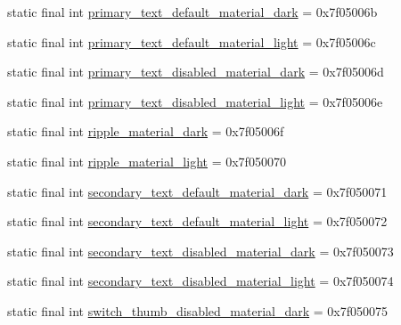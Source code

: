 \begin{DoxyCompactItemize}
\item 
static final int \mbox{\hyperlink{classandroid_1_1support_1_1v7_1_1appcompat_1_1R_1_1color_add4e227c0820079bd8c7277ed459e013}{primary\+\_\+text\+\_\+default\+\_\+material\+\_\+dark}} = 0x7f05006b
\item 
static final int \mbox{\hyperlink{classandroid_1_1support_1_1v7_1_1appcompat_1_1R_1_1color_ab36d1e90360d5a93724ea06e0fb4eaea}{primary\+\_\+text\+\_\+default\+\_\+material\+\_\+light}} = 0x7f05006c
\item 
static final int \mbox{\hyperlink{classandroid_1_1support_1_1v7_1_1appcompat_1_1R_1_1color_a71e048d87b5feafa695cf01a565a4e3e}{primary\+\_\+text\+\_\+disabled\+\_\+material\+\_\+dark}} = 0x7f05006d
\item 
static final int \mbox{\hyperlink{classandroid_1_1support_1_1v7_1_1appcompat_1_1R_1_1color_acbf6e5e5cb1d31d8e8532e7b1402ca96}{primary\+\_\+text\+\_\+disabled\+\_\+material\+\_\+light}} = 0x7f05006e
\item 
static final int \mbox{\hyperlink{classandroid_1_1support_1_1v7_1_1appcompat_1_1R_1_1color_a8a6b3082ea6856989bc2959dfe9276c5}{ripple\+\_\+material\+\_\+dark}} = 0x7f05006f
\item 
static final int \mbox{\hyperlink{classandroid_1_1support_1_1v7_1_1appcompat_1_1R_1_1color_a15949cbaffddc41a139e2075c8bb3f14}{ripple\+\_\+material\+\_\+light}} = 0x7f050070
\item 
static final int \mbox{\hyperlink{classandroid_1_1support_1_1v7_1_1appcompat_1_1R_1_1color_a37d7fa18b0ff48fbaf8ee035afc43a2c}{secondary\+\_\+text\+\_\+default\+\_\+material\+\_\+dark}} = 0x7f050071
\item 
static final int \mbox{\hyperlink{classandroid_1_1support_1_1v7_1_1appcompat_1_1R_1_1color_a2f57c3847bf68150f0fd7f8c93799ad6}{secondary\+\_\+text\+\_\+default\+\_\+material\+\_\+light}} = 0x7f050072
\item 
static final int \mbox{\hyperlink{classandroid_1_1support_1_1v7_1_1appcompat_1_1R_1_1color_a23fe3e162981d29924942c7b1bf05882}{secondary\+\_\+text\+\_\+disabled\+\_\+material\+\_\+dark}} = 0x7f050073
\item 
static final int \mbox{\hyperlink{classandroid_1_1support_1_1v7_1_1appcompat_1_1R_1_1color_a8724fc74358a7718ea386065610dbc0c}{secondary\+\_\+text\+\_\+disabled\+\_\+material\+\_\+light}} = 0x7f050074
\item 
static final int \mbox{\hyperlink{classandroid_1_1support_1_1v7_1_1appcompat_1_1R_1_1color_abcca137fe8d9969eee2d1398c08de973}{switch\+\_\+thumb\+\_\+disabled\+\_\+material\+\_\+dark}} = 0x7f050075

\end{DoxyCompactItemize}
